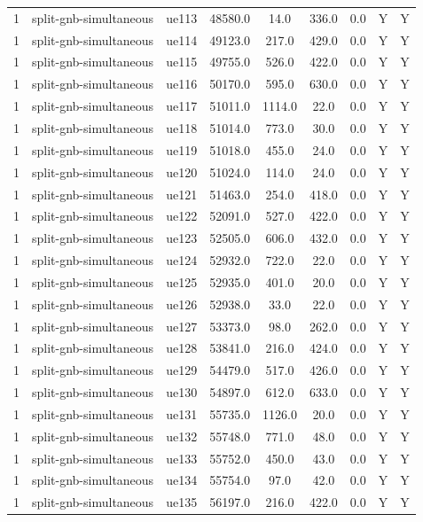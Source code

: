 \begin{table}[ht]
\begin{tabular}{|c|c|c|c|c|c|c|c|c|}
1 & split-gnb-simultaneous & ue113 & 48580.0 & 14.0 & 336.0 & 0.0 & Y & Y \\
1 & split-gnb-simultaneous & ue114 & 49123.0 & 217.0 & 429.0 & 0.0 & Y & Y \\
1 & split-gnb-simultaneous & ue115 & 49755.0 & 526.0 & 422.0 & 0.0 & Y & Y \\
1 & split-gnb-simultaneous & ue116 & 50170.0 & 595.0 & 630.0 & 0.0 & Y & Y \\
1 & split-gnb-simultaneous & ue117 & 51011.0 & 1114.0 & 22.0 & 0.0 & Y & Y \\
1 & split-gnb-simultaneous & ue118 & 51014.0 & 773.0 & 30.0 & 0.0 & Y & Y \\
1 & split-gnb-simultaneous & ue119 & 51018.0 & 455.0 & 24.0 & 0.0 & Y & Y \\
1 & split-gnb-simultaneous & ue120 & 51024.0 & 114.0 & 24.0 & 0.0 & Y & Y \\
1 & split-gnb-simultaneous & ue121 & 51463.0 & 254.0 & 418.0 & 0.0 & Y & Y \\
1 & split-gnb-simultaneous & ue122 & 52091.0 & 527.0 & 422.0 & 0.0 & Y & Y \\
1 & split-gnb-simultaneous & ue123 & 52505.0 & 606.0 & 432.0 & 0.0 & Y & Y \\
1 & split-gnb-simultaneous & ue124 & 52932.0 & 722.0 & 22.0 & 0.0 & Y & Y \\
1 & split-gnb-simultaneous & ue125 & 52935.0 & 401.0 & 20.0 & 0.0 & Y & Y \\
1 & split-gnb-simultaneous & ue126 & 52938.0 & 33.0 & 22.0 & 0.0 & Y & Y \\
1 & split-gnb-simultaneous & ue127 & 53373.0 & 98.0 & 262.0 & 0.0 & Y & Y \\
1 & split-gnb-simultaneous & ue128 & 53841.0 & 216.0 & 424.0 & 0.0 & Y & Y \\
1 & split-gnb-simultaneous & ue129 & 54479.0 & 517.0 & 426.0 & 0.0 & Y & Y \\
1 & split-gnb-simultaneous & ue130 & 54897.0 & 612.0 & 633.0 & 0.0 & Y & Y \\
1 & split-gnb-simultaneous & ue131 & 55735.0 & 1126.0 & 20.0 & 0.0 & Y & Y \\
1 & split-gnb-simultaneous & ue132 & 55748.0 & 771.0 & 48.0 & 0.0 & Y & Y \\
1 & split-gnb-simultaneous & ue133 & 55752.0 & 450.0 & 43.0 & 0.0 & Y & Y \\
1 & split-gnb-simultaneous & ue134 & 55754.0 & 97.0 & 42.0 & 0.0 & Y & Y \\
1 & split-gnb-simultaneous & ue135 & 56197.0 & 216.0 & 422.0 & 0.0 & Y & Y \\

\end{tabular}
\end{table}
